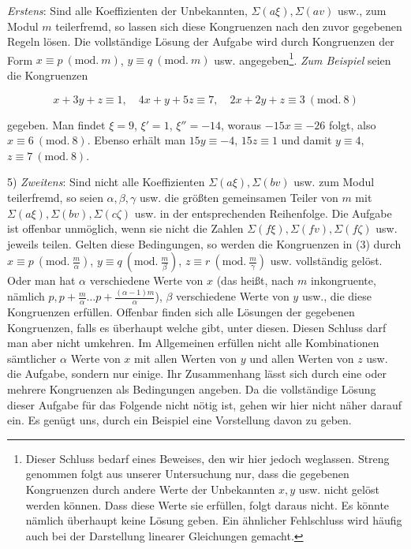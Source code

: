 \emph{Erstens}: Sind alle Koeffizienten der Unbekannten, $\Sigma(a\xi),\Sigma(av)$ usw., zum Modul $m$ teilerfremd, so lassen sich diese Kongruenzen nach den zuvor gegebenen Regeln lösen. Die vollständige Lösung der Aufgabe wird durch Kongruenzen der Form $x\equiv p\ (\mathrm{mod.}\ m)$, $y\equiv q\ (\mathrm{mod.}\ m)$ usw. angegeben\begingroup\renewcommand{\thefootnote}{*)}\footnote{Dieser Schluss bedarf eines Beweises, den wir hier jedoch weglassen. Streng genommen folgt aus unserer Untersuchung nur, dass die gegebenen Kongruenzen durch andere Werte der Unbekannten $x,y$ usw. nicht gelöst werden können. Dass diese Werte sie erfüllen, folgt daraus nicht. Es könnte nämlich überhaupt keine Lösung geben. Ein ähnlicher Fehlschluss wird häufig auch bei der Darstellung linearer Gleichungen gemacht.}\endgroup. \emph{Zum Beispiel} seien die Kongruenzen

\[x+3y+z\equiv1,\quad4x+y+5z\equiv7,\quad2x+2y+z\equiv3\ (\mathrm{mod.}\ 8)\]

gegeben. Man findet $\xi=9$, $\xi'=1$, $\xi''=-14$, woraus $-15x\equiv-26$ folgt, also $x\equiv6\ (\mathrm{mod.}\ 8)$. Ebenso erhält man $15y\equiv-4$, $15z\equiv1$ und damit $y\equiv4$, $z\equiv7\ (\mathrm{mod.}\ 8)$.

5) \emph{Zweitens}: Sind nicht alle Koeffizienten $\Sigma(a\xi),\Sigma(bv)$ usw. zum Modul teilerfremd, so seien $\alpha,\beta,\gamma$ usw. die größten gemeinsamen Teiler von $m$ mit $\Sigma(a\xi),\Sigma(bv),\Sigma(c\zeta)$ usw. in der entsprechenden Reihenfolge. Die Aufgabe ist offenbar unmöglich, wenn sie nicht die Zahlen $\Sigma(f\xi),\Sigma(fv),\Sigma(f\zeta)$ usw. jeweils teilen. Gelten diese Bedingungen, so werden die Kongruenzen in (3) durch $x\equiv p\ (\mathrm{mod.}\ \frac{m}{\alpha})$, $y\equiv q\ (\mathrm{mod.}\ \frac{m}{\beta})$, $z\equiv r\ (\mathrm{mod.}\ \frac{m}{\gamma})$ usw. vollständig gelöst. Oder man hat $\alpha$ verschiedene Werte von $x$ (das heißt, nach $m$ inkongruente, nämlich $p,p+\frac{m}{\alpha}\ldots p+\frac{(\alpha-1)m}{\alpha}$),
$\beta$ verschiedene Werte von $y$ usw., die diese Kongruenzen erfüllen. Offenbar finden sich alle Lösungen der gegebenen Kongruenzen, falls es überhaupt welche gibt, unter diesen. Diesen Schluss darf man aber nicht umkehren. Im Allgemeinen erfüllen nicht alle Kombinationen sämtlicher $\alpha$ Werte von $x$ mit allen Werten von $y$ und allen Werten von $z$ usw. die Aufgabe, sondern nur einige. Ihr Zusammenhang lässt sich durch eine oder mehrere Kongruenzen als Bedingungen angeben. Da die vollständige Lösung dieser Aufgabe für das Folgende nicht nötig ist, gehen wir hier nicht näher darauf ein. Es genügt uns, durch ein Beispiel eine Vorstellung davon zu geben.

